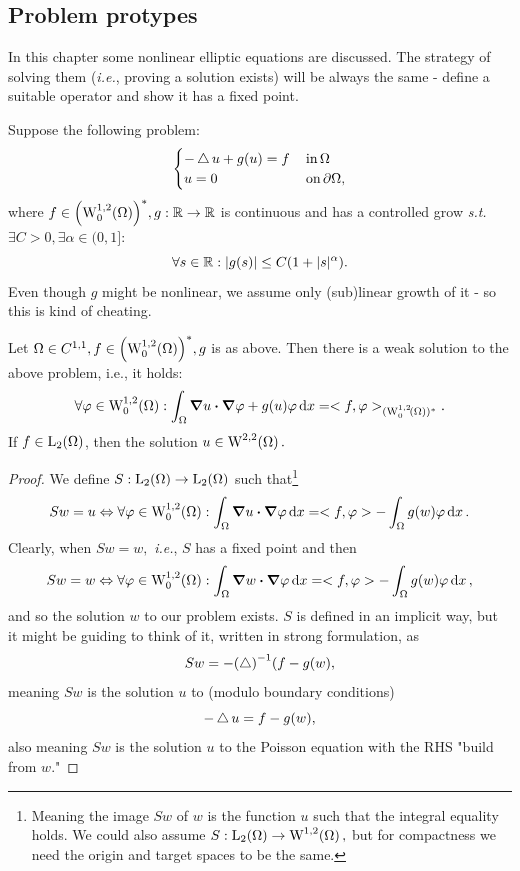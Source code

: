 \documentclass{article}
\begin{document}
\subsection{Problem protypes}
\label{sec:prototypes}

In this chapter some nonlinear elliptic equations are discussed. The strategy of solving them (\textit{i.e.}, proving a solution exists) will be always the same - define a suitable operator and show it has a fixed point.

\begin{example}
	Suppose the following problem: 
	\[
		\begin{cases}
			-\operatorname{\bigtriangleup} u + g(u) = f & \, \text{in} \, \Omega\\
			u = 0 & \, \text{on} \, \partial \Omega,
		\end{cases}
	\]
	where $f \in \qty(\WkpzeroSet[1][2]{\Omega})^{*}, g: \R \to \R$ is continuous and has a controlled grow \textit{s.t.} $\exists C>0, \exists \alpha \in (0,1]$:
	\[
		\forall s \in {\mathbb R}: |g(s)|\leq C\qty(1+|s|^{\alpha}).
	\]
	Even though $g$ might be nonlinear, we assume only (sub)linear growth of it - so this is kind of cheating.

	\begin{theorem}[Existence]
		Let $ \Omega \in C^{1,1}, f \in \qty(\WkpzeroSet[1][2]{\Omega})^{*}, g$ is as above. Then there is a weak solution to the above problem, i.e., it holds:
		\[
			\forall \varphi \in \WkpzeroSet[1][2]{\Omega}: \int_{\Omega}\grad u \vdot \grad \varphi + g(u) \varphi\dd{x} = <f,\varphi>_{(\WkpzeroSet[1][2]{\Omega})^{*}}.
		\]
		If $f \in \LpSet[2]{\Omega}$, then the solution $u \in \WkpSet[2][2]{\Omega}.$
	\end{theorem}
	\begin{proof}
		We define $S: \LpSet[2]{\Omega} \to \LpSet[2]{\Omega}$ such that\footnote{Meaning the image $Sw$ of $w$ is the function $u$ such that the integral equality holds. We could also assume $S: \LpSet[2]{\Omega} \to \WkpSet[1][2]{\Omega},$ but for compactness we need the origin and target spaces to be the same.}
		\[
			Sw = u \Leftrightarrow \forall \varphi \in \WkpzeroSet[1][2]{\Omega}: \int_{\Omega}\grad u \vdot \grad \varphi\dd{x} = <f,\varphi> - \int_{\Omega}g(w) \varphi\dd{x}.
		\]
		Clearly, when $Sw = w,$ \textit{i.e.}, $S$ has a fixed point and then
		\[
			Sw = w \Leftrightarrow \forall \varphi \in \WkpzeroSet[1][2]{\Omega}: \int_{\Omega}\grad w \vdot \grad \varphi \dd{x} = <f, \varphi> - \int_{\Omega}g(w) \varphi\dd{x},
		\]
		and so the solution $w$ to our problem exists. $S$ is defined in an implicit way, but it might be guiding to think of it, written in strong formulation, as
		\[
			Sw = -\qty(\operatorname{\bigtriangleup})^{-1}(f - g(w),
		\]
		meaning $Sw$ is the solution $u$ to (modulo boundary conditions)
		\[
			-\operatorname{\bigtriangleup} u = f- g(w),
		\]
		also meaning $Sw$ is the solution $u$ to the Poisson equation with the RHS "build from $w$."


\end{proof}
\end{example}
\end{document}
